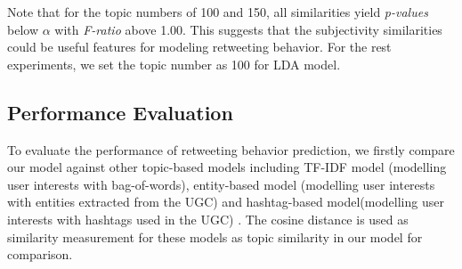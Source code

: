 \documentclass[letterpaper]{article}
\begin{document}
Note that for the topic numbers of 100 and 150, all similarities yield \textit{p-values} below $ \alpha $ with \textit{F-ratio} above 1.00. This suggests that the subjectivity similarities could be useful features for modeling retweeting behavior. 
For the rest experiments, we set the topic number as 100 for LDA model. 

\subsection{Performance Evaluation}

To evaluate the performance of retweeting behavior prediction, we firstly compare our model against other topic-based models including TF-IDF model (modelling user interests with bag-of-words), entity-based model (modelling user interests with entities extracted from the UGC) and hashtag-based model(modelling user interests with hashtags used in the UGC) \cite{abel2011analyzing}. The cosine distance is used as similarity measurement for these models as topic similarity in our model for comparison.
\end{document}

